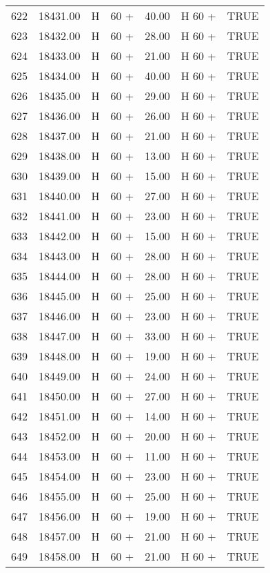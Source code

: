 \begin{table}[ht]
\begin{tabular}{rrllrll}
  622 & 18431.00 & H & 60 + & 40.00 & H 60 + & TRUE \\ 
  623 & 18432.00 & H & 60 + & 28.00 & H 60 + & TRUE \\ 
  624 & 18433.00 & H & 60 + & 21.00 & H 60 + & TRUE \\ 
  625 & 18434.00 & H & 60 + & 40.00 & H 60 + & TRUE \\ 
  626 & 18435.00 & H & 60 + & 29.00 & H 60 + & TRUE \\ 
  627 & 18436.00 & H & 60 + & 26.00 & H 60 + & TRUE \\ 
  628 & 18437.00 & H & 60 + & 21.00 & H 60 + & TRUE \\ 
  629 & 18438.00 & H & 60 + & 13.00 & H 60 + & TRUE \\ 
  630 & 18439.00 & H & 60 + & 15.00 & H 60 + & TRUE \\ 
  631 & 18440.00 & H & 60 + & 27.00 & H 60 + & TRUE \\ 
  632 & 18441.00 & H & 60 + & 23.00 & H 60 + & TRUE \\ 
  633 & 18442.00 & H & 60 + & 15.00 & H 60 + & TRUE \\ 
  634 & 18443.00 & H & 60 + & 28.00 & H 60 + & TRUE \\ 
  635 & 18444.00 & H & 60 + & 28.00 & H 60 + & TRUE \\ 
  636 & 18445.00 & H & 60 + & 25.00 & H 60 + & TRUE \\ 
  637 & 18446.00 & H & 60 + & 23.00 & H 60 + & TRUE \\ 
  638 & 18447.00 & H & 60 + & 33.00 & H 60 + & TRUE \\ 
  639 & 18448.00 & H & 60 + & 19.00 & H 60 + & TRUE \\ 
  640 & 18449.00 & H & 60 + & 24.00 & H 60 + & TRUE \\ 
  641 & 18450.00 & H & 60 + & 27.00 & H 60 + & TRUE \\ 
  642 & 18451.00 & H & 60 + & 14.00 & H 60 + & TRUE \\ 
  643 & 18452.00 & H & 60 + & 20.00 & H 60 + & TRUE \\ 
  644 & 18453.00 & H & 60 + & 11.00 & H 60 + & TRUE \\ 
  645 & 18454.00 & H & 60 + & 23.00 & H 60 + & TRUE \\ 
  646 & 18455.00 & H & 60 + & 25.00 & H 60 + & TRUE \\ 
  647 & 18456.00 & H & 60 + & 19.00 & H 60 + & TRUE \\ 
  648 & 18457.00 & H & 60 + & 21.00 & H 60 + & TRUE \\ 
  649 & 18458.00 & H & 60 + & 21.00 & H 60 + & TRUE \\ 

\end{tabular}
\end{table}
